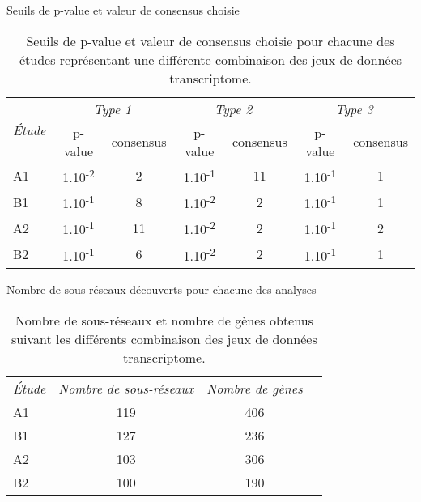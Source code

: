 		\begin{table}
			\begin{center}
				\caption{Seuils de p-value et valeur de consensus choisie}
				\begin{tabular}{lcccccc}
					\toprule
					\multirow{2}{2cm}{\emph{Étude}} & \multicolumn{2}{c}{\centering\emph{Type 1}} & \multicolumn{2}{c}{\centering\emph{Type 2}} & \multicolumn{2}{c}{\centering\emph{Type 3}} \\
					\cmidrule(r){2-3}\cmidrule(r){4-5}\cmidrule(r){6-7}
					& p-value & consensus & p-value & consensus & p-value & consensus \\
					\midrule
					A1	&	1.10\textsuperscript{-2}	&	2	&	1.10\textsuperscript{-1}	&	11	&	1.10\textsuperscript{-1}	&	1	\\
					B1	&	1.10\textsuperscript{-1}	&	8	&	1.10\textsuperscript{-2}	&	2	&	1.10\textsuperscript{-1}	&	1	\\
					A2	&	1.10\textsuperscript{-1}	&	11	&	1.10\textsuperscript{-2}	&	2	&	1.10\textsuperscript{-1}	&	2	\\
					B2	&	1.10\textsuperscript{-1}	&	6	&	1.10\textsuperscript{-2}	&	2	&	1.10\textsuperscript{-1}	&	1	\\
					\bottomrule
				\end{tabular}
				\label{tab:Res1Threshold}
				\vspace{5ex}
				\caption*{Seuils de p-value et valeur de consensus choisie pour chacune des études représentant une différente combinaison des jeux de données transcriptome.}
			\end{center}
		\end{table}

		\begin{table}
			\begin{center}
				\caption{Nombre de sous-réseaux découverts pour chacune des analyses}
				\begin{tabular}{lccc}
					\toprule
					\multirow{2}{2cm}{\emph{Étude}} & \multirow{2}{3cm}{\centering\emph{Nombre de sous-réseaux}} & \multirow{2}{3cm}{\centering\emph{Nombre de gènes}} \\
					&&\\
					\midrule
					A1	&	119	&	406	\\
					B1	&	127	&	236	\\
					A2	&	103	&	306	\\
					B2	&	100	&	190	\\
					\bottomrule
				\end{tabular}
				\label{tab:Res1Networks}
				\vspace{5ex}
				\caption*{Nombre de sous-réseaux et nombre de gènes obtenus suivant les différents combinaison des jeux de données transcriptome.}
			\end{center}
		\end{table}

